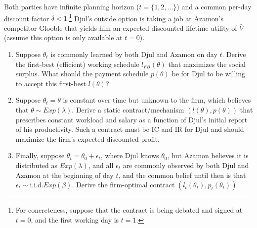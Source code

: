 \documentclass[a4paper]{article}
\newif\ifsolutions
\begin{document}
	Both parties have infinite planning horizon ($t=\{1,2,...\}$) and a common per-day discount factor $\delta<1$.\footnote{For concreteness, suppose that the contract is being debated and signed at $t=0$, and the first working day is $t=1$.} 
	Djul's outside option is taking a job at Azamon's competitor Glooble that yields him an expected discounted lifetime utility of $\bar{V}$ (assume this option is only available at $t=0$).
	
	\begin{enumerate}
		\item Suppose $\theta_t$ is commonly learned by both Djul and Azamon on day $t$. Derive the first-best (efficient) working schedule $l_{FB}(\theta)$ that maximizes the social surplus. What should the payment schedule $p(\theta)$ be for Djul to be willing to accept this first-best $l(\theta)$?
		
		\item Suppose $\theta_t = {\theta}$ is constant over time but unknown to the firm, which believes that ${\theta} \sim Exp(\lambda)$. Derive a static contract/mechanism $(l(\theta), p(\theta))$ that prescribes constant workload and salary as a function of Djul's initial report of his productivity. Such a contract must be IC and IR for Djul and should maximize the firm's expected discounted profit.
		
		\item Finally, suppose $\theta_t = \theta_0 + \epsilon_t$, where Djul knows $\theta_0$, but Azamon believes it is distributed as $Exp(\lambda)$, and all $\epsilon_t$ are commonly observed by both Djul and Azamon at the beginning of day $t$, and the common belief until then is that $\epsilon_t \sim \text{i.i.d.} Exp(\beta)$. Derive the firm-optimal contract $(l_t(\theta_t),p_t(\theta_t))$.
	\end{enumerate}
	
	
	\ifsolutions
\end{document}
